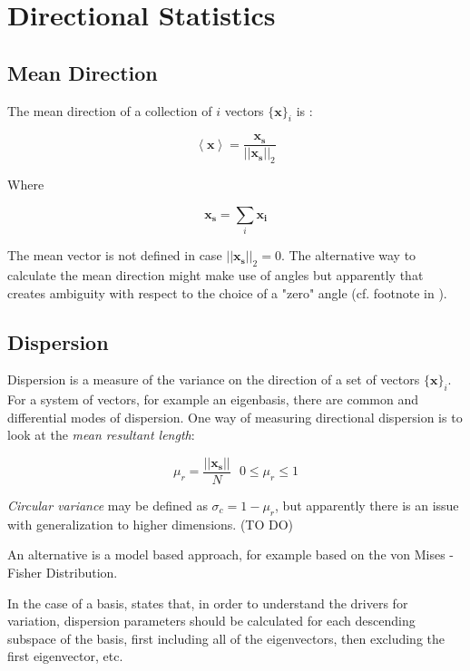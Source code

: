 \section{Directional Statistics}

\subsection{Mean Direction}
The mean direction of a collection of $i$ vectors $\{\mathbf{x}\}_i$ is \cite{damask2019consistently}:

\begin{equation}
\left<\mathbf{x}\right> = \frac{\mathbf{x_s}}{||\mathbf{x_s}||_2}
\end{equation}

Where

\begin{equation}
\mathbf{x_s} = \sum_i \mathbf{x_i}
\end{equation}

The mean vector is not defined in case $||\mathbf{x_s}||_2 = 0$. The alternative way to calculate the mean direction might make use of angles but apparently that creates ambiguity with respect to the choice of a "zero" angle (cf. footnote in ).



\subsection{Dispersion}

Dispersion is a measure of the variance on the direction of a set of vectors $\{\mathbf{x}\}_i$. For a system of vectors, for example an eigenbasis, there are common and differential modes of dispersion. One way of measuring directional dispersion is to look at the \textit{mean resultant length}:

\begin{equation}
\mu_r = \frac{||\mathbf{x_s}||}{N}\ \ \ 0\leq \mu_r \leq 1
\end{equation}


\textit{Circular variance} may be defined as $\sigma_c = 1-\mu_r$, but apparently there is an issue with generalization to higher dimensions. (TO DO)

An alternative is a model based approach, for example based on the von Mises - Fisher Distribution.

In the case of a basis,  states that, in order to understand the drivers for variation, dispersion parameters should be calculated for each descending subspace of the basis, first including all of the eigenvectors, then excluding the first eigenvector, etc.
	



